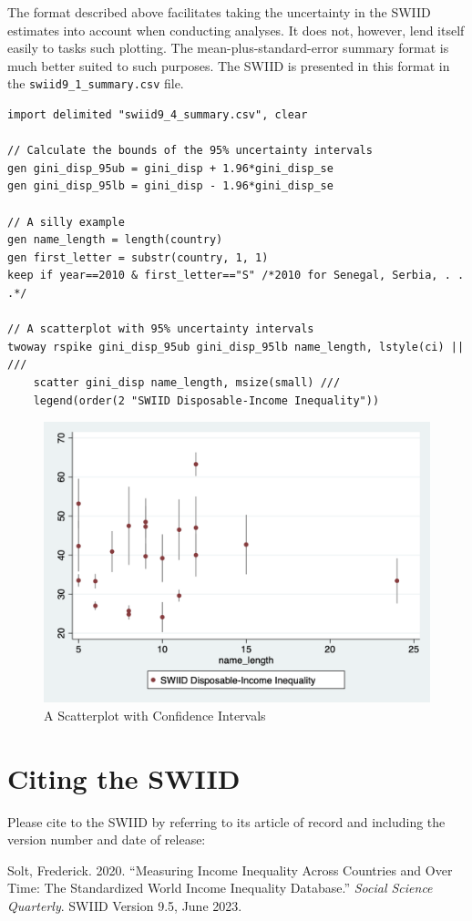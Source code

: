 \documentclass[11pt]{article}
\begin{document}
The format described above facilitates taking the uncertainty in the
SWIID estimates into account when conducting analyses. It does not,
however, lend itself easily to tasks such plotting. The
mean-plus-standard-error summary format is much better suited to such
purposes. The SWIID is presented in this format in the
\texttt{swiid9\_1\_summary.csv} file.


\begin{verbatim}
import delimited "swiid9_4_summary.csv", clear
 
// Calculate the bounds of the 95% uncertainty intervals
gen gini_disp_95ub = gini_disp + 1.96*gini_disp_se
gen gini_disp_95lb = gini_disp - 1.96*gini_disp_se

// A silly example
gen name_length = length(country)
gen first_letter = substr(country, 1, 1)
keep if year==2010 & first_letter=="S" /*2010 for Senegal, Serbia, . . .*/

// A scatterplot with 95% uncertainty intervals
twoway rspike gini_disp_95ub gini_disp_95lb name_length, lstyle(ci) || ///
    scatter gini_disp name_length, msize(small) ///
    legend(order(2 "SWIID Disposable-Income Inequality")) 
\end{verbatim}

\begin{figure}[htbp] 
	\caption{A Scatterplot with Confidence Intervals}
	\label{F:scatter}
	\includegraphics[width=6in]{stata_scatter.png}
\end{figure}

\pagebreak
\section{Citing the SWIID}

Please cite to the SWIID by referring to its article of record and including the version number and date of release:\\

\begin{hangparas}{.25in}{1}
Solt, Frederick. 2020. ``Measuring Income Inequality Across Countries and Over Time: The Standardized World Income Inequality Database.'' \emph{Social Science Quarterly}.  SWIID Version 9.5, June 2023.
\end{hangparas}




\pagebreak
\end{document}
